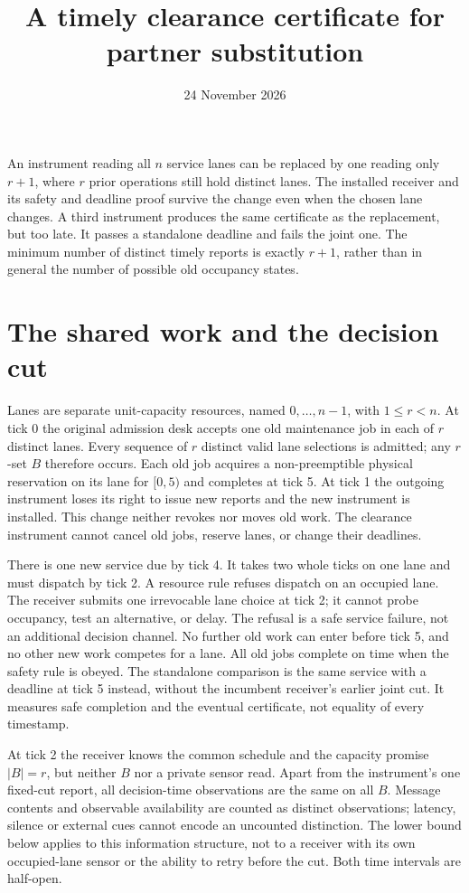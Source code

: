 \documentclass[11pt]{article}
\title{A timely clearance certificate for partner substitution}
\date{24 November 2026}
\begin{document}
\maketitle

An instrument reading all $n$ service lanes can be replaced by one reading only $r+1$, where $r$ prior operations still hold distinct lanes. The installed receiver and its safety and deadline proof survive the change even when the chosen lane changes. A third instrument produces the same certificate as the replacement, but too late. It passes a standalone deadline and fails the joint one. The minimum number of distinct timely reports is exactly $r+1$, rather than in general the number of possible old occupancy states.

\section{The shared work and the decision cut}
Lanes are separate unit-capacity resources, named $0,\ldots,n-1$, with $1\le r<n$. At tick 0 the original admission desk accepts one old maintenance job in each of $r$ distinct lanes. Every sequence of $r$ distinct valid lane selections is admitted; any $r$-set $B$ therefore occurs. Each old job acquires a non-preemptible physical reservation on its lane for $[0,5)$ and completes at tick 5. At tick 1 the outgoing instrument loses its right to issue new reports and the new instrument is installed. This change neither revokes nor moves old work. The clearance instrument cannot cancel old jobs, reserve lanes, or change their deadlines.

There is one new service due by tick 4. It takes two whole ticks on one lane and must dispatch by tick 2. A resource rule refuses dispatch on an occupied lane. The receiver submits one irrevocable lane choice at tick 2; it cannot probe occupancy, test an alternative, or delay. The refusal is a safe service failure, not an additional decision channel. No further old work can enter before tick 5, and no other new work competes for a lane. All old jobs complete on time when the safety rule is obeyed. The standalone comparison is the same service with a deadline at tick 5 instead, without the incumbent receiver's earlier joint cut. It measures safe completion and the eventual certificate, not equality of every timestamp.

At tick 2 the receiver knows the common schedule and the capacity promise $|B|=r$, but neither $B$ nor a private sensor read. Apart from the instrument's one fixed-cut report, all decision-time observations are the same on all $B$. Message contents and observable availability are counted as distinct observations; latency, silence or external cues cannot encode an uncounted distinction. The lower bound below applies to this information structure, not to a receiver with its own occupied-lane sensor or the ability to retry before the cut. Both time intervals are half-open.
\end{document}
